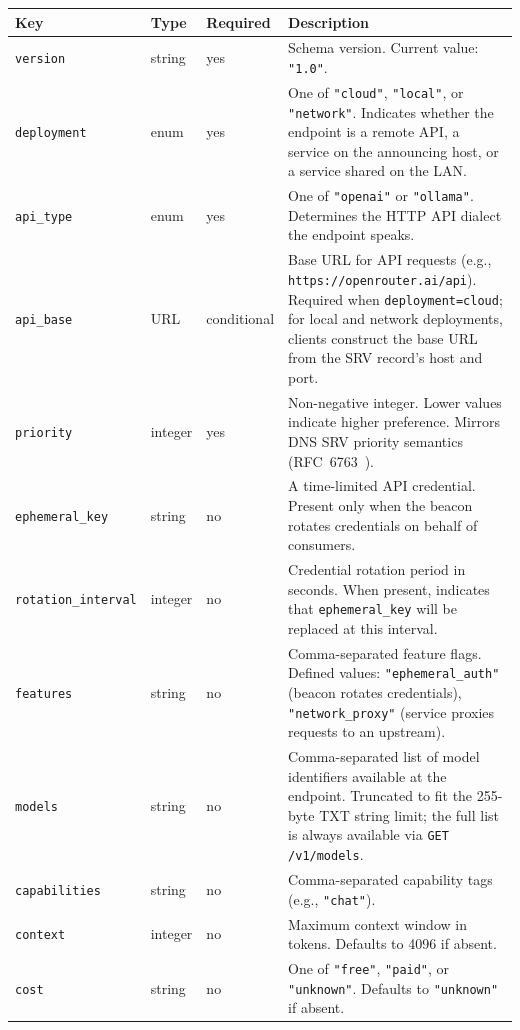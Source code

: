 \begin{center}
\begin{tabular}{l l l p{6cm}}
\hline
\textbf{Key} & \textbf{Type} & \textbf{Required} & \textbf{Description} \\
\hline
\texttt{version}            & string  & yes & Schema version. Current value: \texttt{"1.0"}. \\
\texttt{deployment}         & enum    & yes & One of \texttt{"cloud"}, \texttt{"local"}, or \texttt{"network"}. Indicates whether the endpoint is a remote API, a service on the announcing host, or a service shared on the LAN. \\
\texttt{api\_type}          & enum    & yes & One of \texttt{"openai"} or \texttt{"ollama"}. Determines the HTTP API dialect the endpoint speaks. \\
\texttt{api\_base}          & URL     & conditional & Base URL for API requests (e.g., \texttt{https://openrouter.ai/api}). Required when \texttt{deployment=cloud}; for local and network deployments, clients construct the base URL from the SRV record's host and port. \\
\texttt{priority}           & integer & yes & Non-negative integer. Lower values indicate higher preference. Mirrors DNS SRV priority semantics (RFC~6763~\cite{rfc6763}). \\
\texttt{ephemeral\_key}     & string  & no  & A time-limited API credential. Present only when the beacon rotates credentials on behalf of consumers. \\
\texttt{rotation\_interval} & integer & no  & Credential rotation period in seconds. When present, indicates that \texttt{ephemeral\_key} will be replaced at this interval. \\
\texttt{features}           & string  & no  & Comma-separated feature flags. Defined values: \texttt{"ephemeral\_auth"} (beacon rotates credentials), \texttt{"network\_proxy"} (service proxies requests to an upstream). \\
\texttt{models}             & string  & no  & Comma-separated list of model identifiers available at the endpoint. Truncated to fit the 255-byte TXT string limit; the full list is always available via \texttt{GET /v1/models}. \\
\texttt{capabilities}       & string  & no  & Comma-separated capability tags (e.g., \texttt{"chat"}). \\
\texttt{context}            & integer & no  & Maximum context window in tokens. Defaults to 4096 if absent. \\
\texttt{cost}               & string  & no  & One of \texttt{"free"}, \texttt{"paid"}, or \texttt{"unknown"}. Defaults to \texttt{"unknown"} if absent. \\
\hline
\end{tabular}
\end{center}

